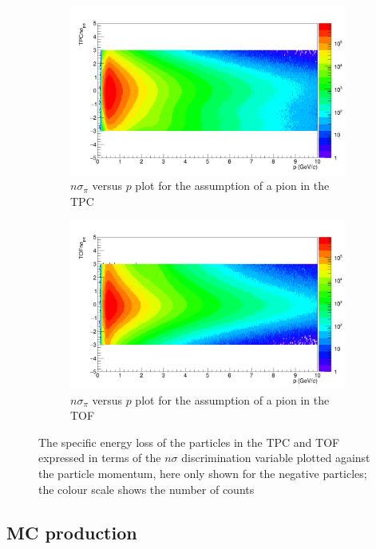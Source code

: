 \begin{figure}[t]
\begin{subfigure}[b]{0.5\linewidth}
\centering
\includegraphics[width=0.98\linewidth]{Figures/ChargedPioCuts/TPCnsigmapioneg.png}
\caption{$n\sigma_{\pi}$ versus $p$ plot for the assumption of a pion in the TPC}
\label{fig:ChpioTPC}
\end{subfigure} \hspace{0.1cm}
\begin{subfigure}[b]{.5\linewidth}
\centering
\includegraphics[width=0.98\linewidth]{Figures/ChargedPioCuts/TOFnsigmapioneg.png}
\caption{$n\sigma_{\pi}$ versus $p$ plot for the assumption of a pion in the TOF}
\label{fig:ChpioTOF}
\end{subfigure}
\caption{The specific energy loss of the particles in the TPC and TOF expressed in terms of the $n\sigma$ discrimination variable plotted against the particle momentum, here only shown for the negative particles; the colour scale shows the number of counts}
\label{fig:PIDChPio}
\end{figure}


\subsection{MC production}
